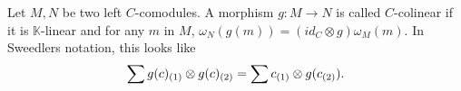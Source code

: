 \documentclass[../thesis.tex]{subfiles}
\begin{document}
\begin{definition}[Comodules]

        
        
        
        
        
        
                            
        
                \end{definition}

                \begin{definition}
                    Let $M, N$ be two left $C$-comodules. A morphism $g:M\rightarrow N$ is called $C$-colinear if it is $\mathbb{K}$-linear and for any $m$ in $M$, $\omega_N(g(m)) = (id_C\otimes g)\omega_M(m)$. In Sweedlers notation, this looks like
                    \begin{align*}
                        \sum g(c)_{(1)}\otimes g(c)_{(2)} = \sum c_{(1)}\otimes g(c_{(2)})\tt{.}
                    \end{align*}
                \end{definition}
\end{document}
